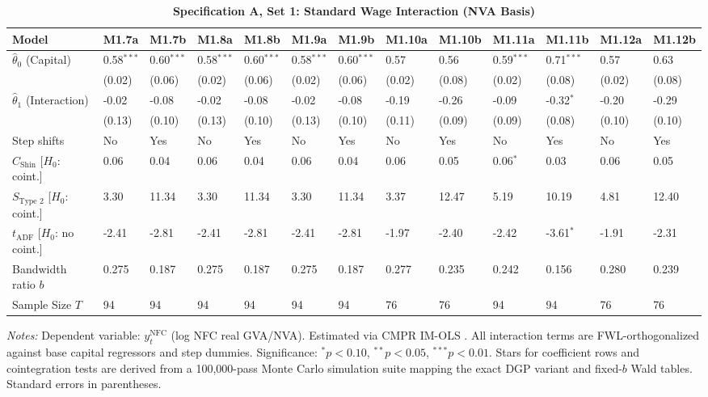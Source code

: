 \FloatBarrier
\begin{table}[h!]
	\centering
	\caption{\textbf{Specification A, Set 1: Standard Wage Interaction (NVA Basis)}}
	\label{tab:specA_set1_nva_app}
	\tiny
	\setlength{\tabcolsep}{1.5pt}
	\begin{tabular}{p{3.2cm}p{1.0cm}p{1.0cm}p{1.0cm}p{1.0cm}p{1.0cm}p{1.0cm}p{1.0cm}p{1.0cm}p{1.0cm}p{1.0cm}p{1.0cm}p{1.0cm}}
		\toprule
		Model & M1.7a & M1.7b & M1.8a & M1.8b & M1.9a & M1.9b & M1.10a & M1.10b & M1.11a & M1.11b & M1.12a & M1.12b \\
		\midrule
		$\hat{\theta}_0$ (Capital) & 0.58$^{***}$ & 0.60$^{***}$ & 0.58$^{***}$ & 0.60$^{***}$ & 0.58$^{***}$ & 0.60$^{***}$ & 0.57 & 0.56 & 0.59$^{***}$ & 0.71$^{***}$ & 0.57 & 0.63 \\
		& (0.02) & (0.06) & (0.02) & (0.06) & (0.02) & (0.06) & (0.02) & (0.08) & (0.02) & (0.08) & (0.02) & (0.08) \\
		$\hat{\theta}_1$ (Interaction) & -0.02 & -0.08 & -0.02 & -0.08 & -0.02 & -0.08 & -0.19 & -0.26 & -0.09 & -0.32$^{*}$ & -0.20 & -0.29 \\
		& (0.13) & (0.10) & (0.13) & (0.10) & (0.13) & (0.10) & (0.11) & (0.09) & (0.09) & (0.08) & (0.10) & (0.10) \\
		\midrule
		Step shifts & No & Yes & No & Yes & No & Yes & No & Yes & No & Yes & No & Yes \\
		$C_{\text{Shin}}$ [$H_0$: coint.] & 0.06 & 0.04 & 0.06 & 0.04 & 0.06 & 0.04 & 0.06 & 0.05 & 0.06$^{*}$ & 0.03 & 0.06 & 0.05 \\
		$S_{\text{Type 2}}$ [$H_0$: coint.] & 3.30 & 11.34 & 3.30 & 11.34 & 3.30 & 11.34 & 3.37 & 12.47 & 5.19 & 10.19 & 4.81 & 12.40 \\
		$t_{\text{ADF}}$ [$H_0$: no coint.] & -2.41 & -2.81 & -2.41 & -2.81 & -2.41 & -2.81 & -1.97 & -2.40 & -2.42 & -3.61$^{*}$ & -1.91 & -2.31 \\
		Bandwidth ratio $b$ & 0.275 & 0.187 & 0.275 & 0.187 & 0.275 & 0.187 & 0.277 & 0.235 & 0.242 & 0.156 & 0.280 & 0.239 \\
		Sample Size $T$ & 94 & 94 & 94 & 94 & 94 & 94 & 76 & 76 & 94 & 94 & 76 & 76 \\
		\bottomrule
	\end{tabular}
	\begin{minipage}{\textwidth}
		\scriptsize
		\textit{Notes:} Dependent variable: $y_t^{\text{NFC}}$ (log NFC real GVA/NVA). Estimated via CMPR IM-OLS \citep{VogelsangWagner2014}. All interaction terms are FWL-orthogonalized against base capital regressors and step dummies. Significance: $^*p<0.10$, $^{**}p<0.05$, $^{***}p<0.01$. Stars for coefficient rows and cointegration tests are derived from a 100,000-pass Monte Carlo simulation suite mapping the exact DGP variant and fixed-$b$ Wald tables. Standard errors in parentheses.
	\end{minipage}
\end{table}

